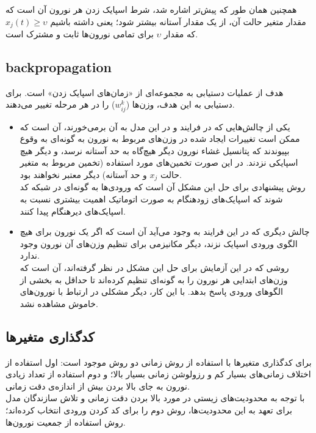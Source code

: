 \documentclass[a4paper]{article}
\begin{document}
همچنین همان طور که پیش‌تر اشاره شد، شرط اسپایک زدن هر نورون آن است که مقدار متغیر حالت آن، از یک مقدار آستانه بیشتر شود؛ یعنی داشته باشیم 
$x_j(t)\geq\upsilon$
که مقدار $\upsilon$ برای تمامی نورون‌ها ثابت و مشترک است.


\subsection{backpropagation}
هدف از عملیات  دستیابی به مجموعه‌ای از «زمان‌های اسپایک زدن» است. برای دستیابی به این هدف، وزن‌ها ($w_{ij}^k$) را در هر مرحله تغییر می‌دهند.\\

\begin{itemize}
	\item 
	یکی از چالش‌هایی که در فرایند  و در این مدل به آن برمی‌خورند، آن است که ممکن است تغییرات ایجاد شده در وزن‌های مربوط به نورون به گونه‌ای به وقوع بپیوندند که پتانسیل غشاء نورون دیگر هیچ‌گاه به حد آستانه نرسد، و دیگر هیچ اسپایکی نزدند. در این صورت تخمین‌های مورد استفاده (تخمین مربوط به متغیر حالت $x_j$ و حد آستانه) دیگر معتبر نخواهند بود.\\
	 روش پیشنهادی برای حل این مشکل آن است که ورودی‌ها به گونه‌ای در شبکه کد شوند که اسپایک‌های زودهنگام به صورت اتوماتیک اهمیت بیشتری نسبت به اسپایک‌های دیرهنگام پیدا کنند.
	 
	 \item 
	 چالش دیگری که در این فرایند به وجود می‌آید آن است که اگر یک نورون برای هیچ الگوی ورودی اسپایک نزند، دیگر مکانیزمی برای تنظیم وزن‌های آن نورون وجود ندارد.\\
	 روشی که در این آزمایش برای حل این مشکل در نظر گرفته‌اند، آن است که وزن‌های ابتدایی هر نورون را به گونه‌ای تنظیم کرده‌اند تا حداقل به بخشی از الگوهای ورودی پاسخ بدهد. با این کار، دیگر مشکلی در ارتباط با نورون‌های خاموش مشاهده نشد.
\end{itemize} 

\subsection{کدگذاری متغیرها}
برای کدگذاری متغیرها با استفاده از روش زمانی 
دو روش موجود است: اول استفاده از اختلاف زمانی‌های بسیار کم و رزولوشن زمانی بسیار بالا؛ و دوم استفاده از تعداد زیادی نورون به جای بالا بردن بیش از اندازه‌ی دقت زمانی.\\
با توجه به محدودیت‌های زیستی در مورد بالا بردن دقت زمانی و تلاش سازندگان مدل برای تعهد به این محدودیت‌ها، روش دوم را برای کد کردن ورودی انتخاب کرده‌اند؛ روش استفاده از جمعیت نورون‌ها.\\
\end{document}
